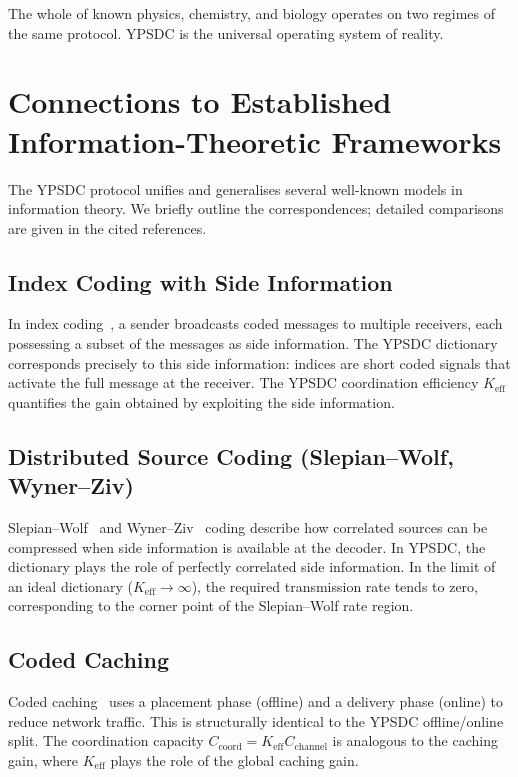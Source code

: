 \documentclass[12pt,a4paper]{article}
\theoremstyle{remark}
\begin{document}
	The whole of known physics, chemistry, and biology operates on two regimes of the same protocol.
	YPSDC is the universal operating system of reality.
	
	
	\section{Connections to Established Information-Theoretic Frameworks}
	\label{sec:classical-connections}
	
	The YPSDC protocol unifies and generalises several well-known models in information theory. We briefly outline the correspondences; detailed comparisons are given in the cited references.
	
	\subsection*{Index Coding with Side Information}
	In index coding~\cite{Birk1998,BarYossef2011}, a sender broadcasts coded messages to multiple receivers, each possessing a subset of the messages as side information. The YPSDC dictionary corresponds precisely to this side information: indices are short coded signals that activate the full message at the receiver. The YPSDC coordination efficiency \(K_{\mathrm{eff}}\) quantifies the gain obtained by exploiting the side information.
	
	\subsection*{Distributed Source Coding (Slepian--Wolf, Wyner--Ziv)}
	Slepian--Wolf~\cite{SlepianWolf1973} and Wyner--Ziv~\cite{WynerZiv1976} coding describe how correlated sources can be compressed when side information is available at the decoder. In YPSDC, the dictionary plays the role of perfectly correlated side information. In the limit of an ideal dictionary (\(K_{\mathrm{eff}} \to \infty\)), the required transmission rate tends to zero, corresponding to the corner point of the Slepian--Wolf rate region.
	
	\subsection*{Coded Caching}
	Coded caching~\cite{MaddahAli2014} uses a placement phase (offline) and a delivery phase (online) to reduce network traffic. This is structurally identical to the YPSDC offline/online split. The coordination capacity \(C_{\mathrm{coord}} = K_{\mathrm{eff}} C_{\mathrm{channel}}\) is analogous to the caching gain, where \(K_{\mathrm{eff}}\) plays the role of the global caching gain.
	
\end{document}

